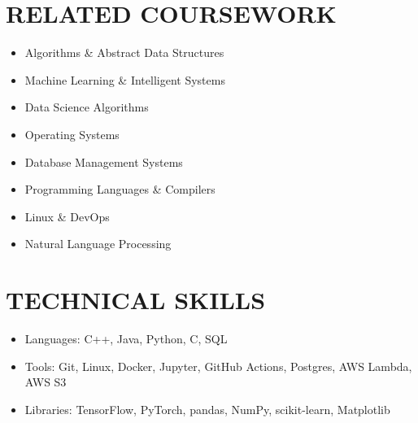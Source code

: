 \documentclass[11pt, a4paper, roman]{moderncv}
\begin{document}
\begin{multicols}{2}
\section{RELATED COURSEWORK}
{\begin{itemize}
    \item Algorithms \& Abstract Data Structures
    \item Machine Learning \& Intelligent Systems
    \item Data Science Algorithms
    \item Operating Systems
    \item Database Management Systems
    \item Programming Languages \& Compilers
    \item Linux \& DevOps
    \item Natural Language Processing
  \end{itemize}
}

\columnbreak

\section{TECHNICAL SKILLS}
{\begin{itemize}
    \item Languages: C++, Java, Python, C, SQL
    \item Tools: Git, Linux, Docker, Jupyter, GitHub Actions, Postgres, AWS Lambda, AWS S3
    \item Libraries: TensorFlow, PyTorch, pandas, NumPy, scikit-learn, Matplotlib
  \end{itemize}
}
\end{multicols}
\end{document}
